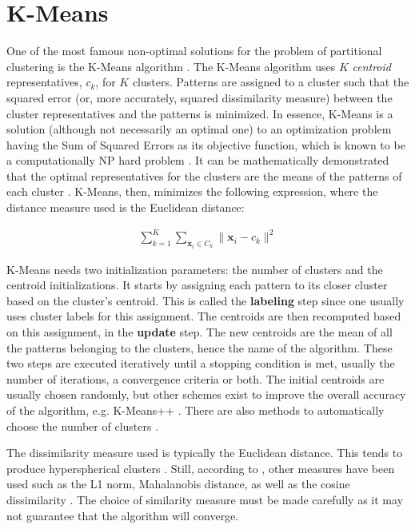 \section{K-Means}
\label{sec:kmeans}

One of the most famous non-optimal solutions for the problem of partitional clustering is the K-Means algorithm \cite{kmeansoriginal}.
The K-Means algorithm uses $K$ \emph{centroid} representatives, $c_k$, for $K$ clusters.
Patterns are assigned to a cluster such that the squared error (or, more accurately, squared dissimilarity measure) between the cluster representatives and the patterns is minimized.
In essence, K-Means is a solution (although not necessarily an optimal one) to an optimization problem having the Sum of Squared Errors as its objective function, which is known to be a computationally NP hard problem \cite{Jain2010}.
It can be mathematically demonstrated that the optimal representatives for the clusters are the means of the patterns of each cluster \cite{Aggarwal2014}.
K-Means, then, minimizes the following expression, where the distance measure used is the Euclidean distance:

\begin{align}
    \sum^K_{k=1} \sum_{\mathbf{x}_i \in C_k} \| \mathbf{x}_i - c_k  \| ^2  \label{eq:sse}
\end{align}

K-Means needs two initialization parameters: the number of clusters and the centroid initializations.
It starts by assigning each pattern to its closer cluster based on the cluster's centroid.
This is called the \textbf{labeling} step since one usually uses cluster labels for this assignment.
The centroids are then recomputed based on this assignment, in the \textbf{update} step.
The new centroids are the mean of all the patterns belonging to the clusters, hence the name of the algorithm.
These two steps are executed iteratively until a stopping condition is met, usually the number of iterations, a convergence criteria or both.
The initial centroids are usually chosen randomly, but other schemes exist to improve the overall accuracy of the algorithm, e.g. K-Means++ \cite{Arthur2007}.
There are also methods to automatically choose the number of clusters \cite{Aggarwal2014}.

The dissimilarity measure used is typically the Euclidean distance.
This tends to produce hyperspherical clusters \cite{Jain1999}.
Still, according to \cite{Jain2010}, other measures have been used such as the L1 norm, Mahalanobis distance, as well as the cosine dissimilarity \cite{Aggarwal2014}.
The choice of similarity measure must be made carefully as it may not guarantee that the algorithm will converge.

